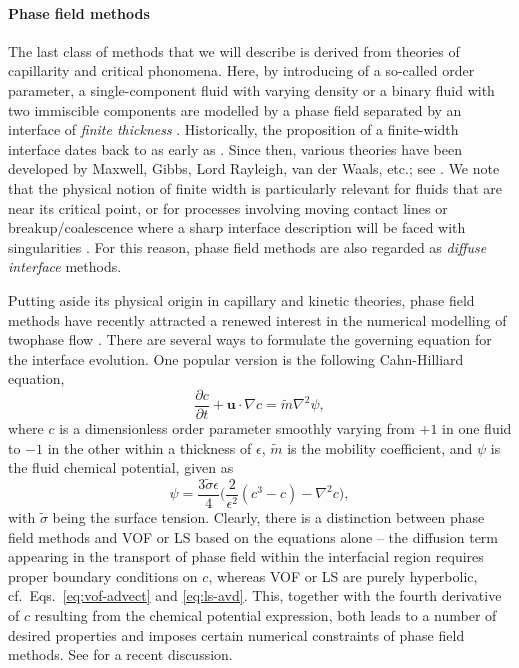 \medskip
\paragraph{\bf Phase field methods}

The last class of methods that we will describe is derived from theories of capillarity and critical phonomena.
Here, by introducing of a so-called order parameter, a single-component fluid with varying density or a binary fluid with two immiscible components are modelled by a phase field separated by an interface of \emph{finite thickness} \citep{Anderson_McFadden_Wheeler}.
Historically, the proposition of a finite-width interface dates back to as early as \cite{Poisson1831}. Since then, various theories have been developed by Maxwell, Gibbs, Lord Rayleigh, van der Waals, etc.; see \eg \cite{van-der-waals1893, Cahn1961}.
We note that the physical notion of finite width is particularly relevant for fluids that are near its critical point, or for processes involving moving contact lines or breakup/coalescence where a sharp interface description will be faced with singularities \citep{Zhang_Mohseni_2018, Eggers1997}.
For this reason, phase field methods are also regarded as \emph{diffuse interface} methods.

Putting aside its physical origin in capillary and kinetic theories, phase field methods have recently attracted a renewed interest in the numerical modelling of twophase flow \citep{jacqmin_1999a, Jacqmin2000, Badalassi_etal_2003, Ding_Spelt_Shu2007, Shen_Yang_2010, dong_shen_2012a, Wang_Shu_Shao_Wu_Niu_2015, Martin, Mirjalili_Ivey_Mani_2020}.
There are several ways to formulate the governing equation for the interface evolution. One popular version is the following Cahn-Hilliard equation,
\begin{equation} \label{eq:C-H}
  \frac{\partial c}{\partial t} + {\bm u}\cdot \nabla c =\tilde{m}\nabla ^2 \psi,
\end{equation}
where $c$ is a dimensionless order parameter smoothly varying from $+1$ in one fluid to $-1$ in the other within a thickness of $\epsilon$,
$\tilde{m}$ is the mobility coefficient,
and $\psi$ is the fluid chemical potential, given as
\begin{equation} \label{eq:ch-chem}
  \psi = \frac{3\tilde{\sigma} \epsilon}{4} 
  \bigg(\frac{2}{\epsilon^2}(c^3-c) -\nabla ^2 c \bigg),
\end{equation}
with $\tilde{\sigma}$ being the surface tension.
Clearly, there is a distinction between phase field methods and VOF or LS based on the equations alone --
the diffusion term appearing in the transport of phase field within the interfacial region requires proper boundary conditions on $c$, whereas VOF or LS are purely hyperbolic, cf.\ Eqs.\ \eqref{eq:vof-advect} and \eqref{eq:ls-avd}.
This, together with the fourth derivative of $c$ resulting from the chemical potential expression, both leads to a number of desired properties and imposes certain numerical constraints of phase field methods.
See \cite{Mirjalili_Ivey_Mani_2020} for a recent discussion.

